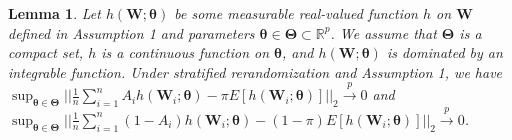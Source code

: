 \documentclass[12pt]{article}
\newtheorem{lemma}{Lemma}
\newcommand{\bX}{\boldsymbol{X}}
\newcommand{\bO}{\boldsymbol{O}}
\newcommand{\bW}{\boldsymbol{W}}
\newcommand{\bI}{\boldsymbol{I}}
\newcommand{\btheta}{\boldsymbol{\theta}}
\newcommand{\bTheta}{\boldsymbol{\Theta}}
\newcommand{\bpsi}{\boldsymbol{\psi}}
\newcommand{\tA}{\widetilde{A}}
\begin{document}

\begin{lemma}\label{lemma4}
    Let $h(\bW;\btheta)$ be some measurable real-valued function $h$ on $\bW$ defined in Assumption 1 and parameters $\btheta \in \bTheta \subset \mathbb{R}^p$. 
    We assume that $\bTheta$ is a compact set, $h$ is a continuous function on $\btheta$, and  $h(\bW;\btheta)$ is dominated by an integrable function. 
    Under stratified rerandomization and Assumption 1, we have $\sup_{\btheta \in \bTheta}||\frac{1}{n} \sum_{i=1}^n A_i h(\bW_i;\btheta) - \pi E[h(\bW_i;\btheta)] ||_2 \xrightarrow{p} 0$ and $\sup_{\btheta \in \bTheta}||\frac{1}{n} \sum_{i=1}^n (1-A_i) h(\bW_i;\btheta) - (1-\pi) E[h(\bW_i;\btheta)] ||_2 \xrightarrow{p} 0$.
\end{lemma}
\end{document}
